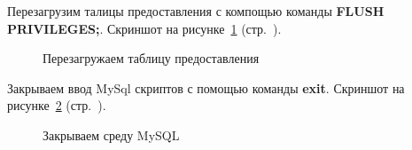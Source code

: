 Перезагрузим талицы предоставления с компощью команды \textbf{FLUSH PRIVILEGES;}. Скриншот на рисунке~\ref{fig:make-phpmyadmin-superuser-step-4} (стр.~\pageref{fig:make-phpmyadmin-superuser-step-4}).

\begin{figure}[!htp]
    \caption{Перезагружаем таблицу предоставления}
    \label{fig:make-phpmyadmin-superuser-step-4}
\end{figure}

Закрываем ввод MySql скриптов с помощью команды \textbf{exit}. Скриншот на рисунке~\ref{fig:make-phpmyadmin-superuser-step-5} (стр.~\pageref{fig:make-phpmyadmin-superuser-step-5}).

\begin{figure}[!htp]
    \caption{Закрываем среду MySQL}
    \label{fig:make-phpmyadmin-superuser-step-5}
\end{figure}

